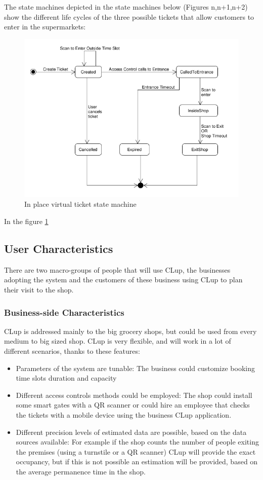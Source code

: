     The state machines depicted in the state machines below (Figures n,n+1,n+2) show the different life cycles of the three possible tickets that allow customers to enter in the supermarkets: 
    \begin{figure}
        \centering
        \includegraphics[width=\textwidth]{Images/UML_in_place_virtual_ticket.png}
        \caption{ \label{fig:Booked_Ticket_State}In place virtual ticket state machine}
    \end{figure}
    In the figure \ref{fig:Booked_Ticket_State} 
\subsection{User Characteristics}
    There are two macro-groups of people that will use CLup, the businesses adopting the system and the customers of these
    business using CLup to plan their visit to the shop.
    \subsubsection{Business-side Characteristics}
    CLup is addressed mainly to the big grocery shops, but could be used from every medium to big sized shop.
    CLup is very flexible, and will work in a lot of different scenarios, thanks to these features:
    \begin{itemize}
        \item Parameters of the system are tunable: The business could customize booking time slots duration and capacity
        \item Different access controls methods could be employed: The shop could install some smart gates with a QR scanner
              or could hire an employee that checks the tickets with a mobile device using the business CLup application. 
        \item Different precision levels of estimated data are possible, based on the data sources available:
              For example if the shop counts the number of people exiting the premises (using a turnstile or a QR scanner) 
              CLup will provide the exact occupancy, but if this is not possible an estimation will be provided, based on the 
              average permanence time in the shop.  
          
    \end{itemize}
